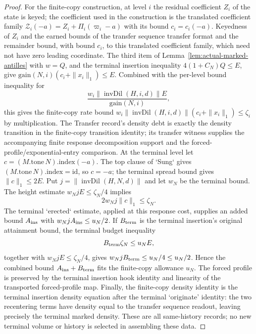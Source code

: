 \begin{proof}
For the finite-copy construction, at level $i$ the residual coefficient
$Z_i$ of the state is keyed; the coefficient used in the construction is the
translated coefficient family $\mathcal Z_i(-a)=Z_i+\Pi_i(\varpi_i-a)$ with its bound
$c_i=c_i(-a)$. Keyedness of $Z_i$ and the earned bounds of the transfer sequence
transfer format and the remainder bound, with bound $c_i$, to this
translated coefficient family, which need not have zero leading coordinate. The third
item of Lemma~\ref{lem:actual-marked-antilles} with $w=Q$, and the terminal insertion
inequality $4(1+C_N)Q\leq E$, give
$\mathrm{gain}(N,i)(c_i+\|x_i\|_1)\leq E$. Combined with the
per-level bound inequality for
\[
 \frac{w_i\|\operatorname{invDil}(H,i,d)\|E}{\mathrm{gain}(N,i)},
\]
this gives the finite-copy rate bound
$w_i\|\operatorname{invDil}(H,i,d)\|(c_i+\|x_i\|_1)\leq\zeta_i$ by
multiplication. The
Transfer record's density debt is exactly the density transition in the finite-copy transition identity;
its transfer witness supplies the accompanying finite response decomposition support and the
forced-profile/exponential-entry comparison. At the terminal level let
$c=(M.\mathrm{tone}\,N).\mathrm{index}(-a)$. The top clause of `Sung` gives
$(M.\mathrm{tone}\,N).\mathrm{index}=\mathrm{id}$, so $c=-a$; the
terminal spread bound gives $\|c\|_1\leq2E$. Put
$j=\|\operatorname{invDil}(H,N,d)\|$ and let $w_N$ be the terminal bound.
The height estimate $w_NjE\leq\zeta_N/4$ implies
\[
 2w_Nj\|c\|_1\leq\zeta_N.
\]
The terminal `erected` estimate, applied at this response cost, supplies an
added bound $A_{\rm ins}$ with $w_NjA_{\rm ins}\leq u_N/2$. If
$B_{\rm term}$ is the terminal insertion's original attainment bound, the terminal budget
inequality
\[ B_{\rm term}\zeta_N\leq u_NE, \]
together with
$w_NjE\leq\zeta_N/4$, gives
$w_NjB_{\rm term}\leq u_N/4\leq u_N/2$. Hence the combined bound
$A_{\rm ins}+B_{\rm term}$ fits the finite-copy allowance $u_N$. The forced profile is
preserved by the terminal insertion hook identity and linearity of
the transported forced-profile map. Finally, the finite-copy density identity is the terminal insertion density
equation after the terminal `originate' identity: the two recentering
terms have density equal to the transfer sequence readout, leaving precisely the
terminal marked density. These are all same-history records; no new
terminal volume or history is selected in assembling these data.


\end{proof}
